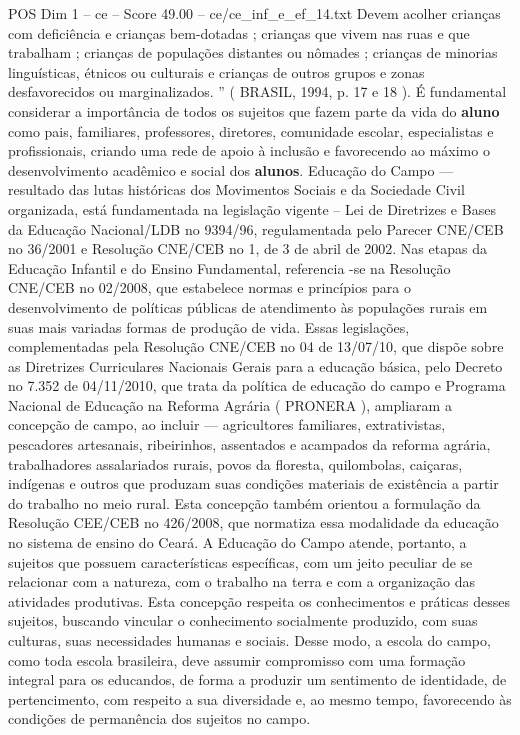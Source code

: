 \begin{textsample}{POS Dim 1 – ce – Score 49.00 – ce/ce\_inf\_e\_ef\_14.txt}
Devem acolher crianças com deficiência e crianças bem-dotadas ; crianças que vivem nas ruas e que trabalham ; crianças de populações distantes ou nômades ; crianças de minorias linguísticas, étnicos ou culturais e crianças de outros grupos e zonas desfavorecidos ou marginalizados. ” ( BRASIL, 1994, p. 17 e 18 ).
É fundamental considerar a importância de todos os sujeitos que fazem parte da vida do \textbf{aluno} como pais, familiares, professores, diretores, comunidade escolar, especialistas e profissionais, criando uma rede de apoio à inclusão e favorecendo ao máximo o desenvolvimento acadêmico e social dos \textbf{alunos}.
Educação do Campo — resultado das lutas históricas dos Movimentos Sociais e da Sociedade Civil organizada, está fundamentada na legislação vigente – Lei de Diretrizes e Bases da Educação Nacional/LDB no 9394/96, regulamentada pelo Parecer CNE/CEB no 36/2001 e Resolução CNE/CEB no 1, de 3 de abril de 2002.
Nas etapas da Educação Infantil e do Ensino Fundamental, referencia -se na Resolução CNE/CEB no 02/2008, que estabelece normas e princípios para o desenvolvimento de políticas públicas de atendimento às populações rurais em suas mais variadas formas de produção de vida.
Essas legislações, complementadas pela Resolução CNE/CEB no 04 de 13/07/10, que dispõe sobre as Diretrizes Curriculares Nacionais Gerais para a educação básica, pelo Decreto no 7.352 de 04/11/2010, que trata da política de educação do campo e Programa Nacional de Educação na Reforma Agrária ( PRONERA ), ampliaram a concepção de campo, ao incluir — agricultores familiares, extrativistas, pescadores artesanais, ribeirinhos, assentados e acampados da reforma agrária, trabalhadores assalariados rurais, povos da floresta, quilombolas, caiçaras, indígenas e outros que produzam suas condições materiais de existência a partir do trabalho no meio rural.
Esta concepção também orientou a formulação da Resolução CEE/CEB no 426/2008, que normatiza essa modalidade da educação no sistema de ensino do Ceará.
A Educação do Campo atende, portanto, a sujeitos que possuem características específicas, com um jeito peculiar de se relacionar com a natureza, com o trabalho na terra e com a organização das atividades produtivas.
Esta concepção respeita os conhecimentos e práticas desses sujeitos, buscando vincular o conhecimento socialmente produzido, com suas culturas, suas necessidades humanas e sociais.
Desse modo, a escola do campo, como toda escola brasileira, deve assumir compromisso com uma formação integral para os educandos, de forma a produzir um sentimento de identidade, de pertencimento, com respeito a sua diversidade e, ao mesmo tempo, favorecendo às condições de permanência dos sujeitos no campo.

\end{textsample}
